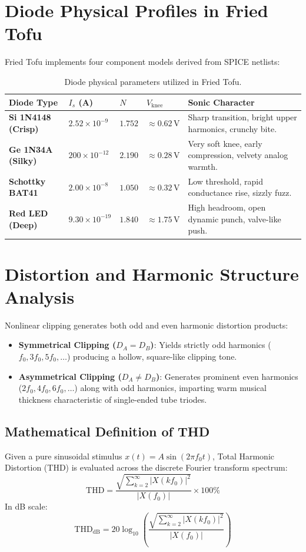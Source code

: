 \documentclass[11pt,a4paper]{article}
\begin{document}
\section{Diode Physical Profiles in Fried Tofu}
Fried Tofu implements four component models derived from SPICE netlists:
\begin{table}[h]
\centering
\begin{tabular}{@{}llllp{5.5cm}@{}}
\toprule
\textbf{Diode Type} & \textbf{$I_s$ (A)} & \textbf{$N$} & \textbf{$V_{\text{knee}}$} & \textbf{Sonic Character} \\ \midrule
\textbf{Si 1N4148 (Crisp)} & $2.52 \times 10^{-9}$ & $1.752$ & $\approx 0.62\,\text{V}$ & Sharp transition, bright upper harmonics, crunchy bite. \\
\textbf{Ge 1N34A (Silky)}  & $200 \times 10^{-12}$ & $2.190$ & $\approx 0.28\,\text{V}$ & Very soft knee, early compression, velvety analog warmth. \\
\textbf{Schottky BAT41}    & $2.00 \times 10^{-8}$ & $1.050$ & $\approx 0.32\,\text{V}$ & Low threshold, rapid conductance rise, sizzly fuzz. \\
\textbf{Red LED (Deep)}    & $9.30 \times 10^{-19}$ & $1.840$ & $\approx 1.75\,\text{V}$ & High headroom, open dynamic punch, valve-like push. \\ \bottomrule
\end{tabular}
\caption{Diode physical parameters utilized in Fried Tofu.}
\end{table}

\section{Distortion and Harmonic Structure Analysis}
Nonlinear clipping generates both odd and even harmonic distortion products:
\begin{itemize}
    \item \textbf{Symmetrical Clipping ($D_A = D_B$)}: Yields strictly odd harmonics ($f_0, 3f_0, 5f_0, \dots$) producing a hollow, square-like clipping tone.
    \item \textbf{Asymmetrical Clipping ($D_A \neq D_B$)}: Generates prominent even harmonics ($2f_0, 4f_0, 6f_0, \dots$) along with odd harmonics, imparting warm musical thickness characteristic of single-ended tube triodes.
\end{itemize}

\subsection{Mathematical Definition of THD}
Given a pure sinusoidal stimulus $x(t) = A \sin(2\pi f_0 t)$, Total Harmonic Distortion (THD) is evaluated across the discrete Fourier transform spectrum:
\begin{equation}
    \text{THD} = \frac{\sqrt{\sum_{k=2}^{\infty} |X(k f_0)|^2}}{|X(f_0)|} \times 100\%
\end{equation}
In dB scale:
\begin{equation}
    \text{THD}_{\text{dB}} = 20 \log_{10}\left( \frac{\sqrt{\sum_{k=2}^{\infty} |X(k f_0)|^2}}{|X(f_0)|} \right)
\end{equation}
\end{document}

